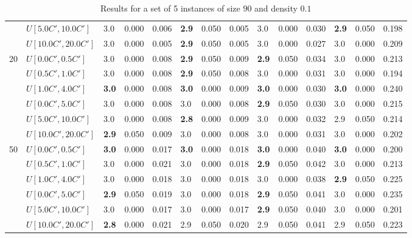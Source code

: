 \begin{table}[h]
{\begin{tabular}{|l|l||l|l|l||l|l|l||l|l|l||l|l|l|}
       & $U[5.0C',10.0C']$ & 3.0 & 0.000 & 0.006 & \textbf{2.9} & 0.050 & 0.005 & 3.0 & 0.000 & 0.030 & \textbf{2.9} & 0.050 & 0.198 \\
       & $U[10.0C',20.0C']$ & 3.0 & 0.000 & 0.005 & \textbf{2.9} & 0.050 & 0.005 & 3.0 & 0.000 & 0.027 & 3.0 & 0.000 & 0.209 \\
      \hline\hline
      \multirow{6}{*}{20} & $U[0.0C',0.5C']$ & 3.0 & 0.000 & 0.008 & \textbf{2.9} & 0.050 & 0.009 & \textbf{2.9} & 0.050 & 0.034 & 3.0 & 0.000 & 0.213 \\
       & $U[0.5C',1.0C']$ & 3.0 & 0.000 & 0.008 & \textbf{2.9} & 0.050 & 0.008 & 3.0 & 0.000 & 0.031 & 3.0 & 0.000 & 0.194 \\
       & $U[1.0C',4.0C']$ & \textbf{3.0} & 0.000 & 0.008 & \textbf{3.0} & 0.000 & 0.009 & \textbf{3.0} & 0.000 & 0.030 & \textbf{3.0} & 0.000 & 0.240 \\
       & $U[0.0C',5.0C']$ & 3.0 & 0.000 & 0.008 & 3.0 & 0.000 & 0.008 & \textbf{2.9} & 0.050 & 0.030 & 3.0 & 0.000 & 0.215 \\
       & $U[5.0C',10.0C']$ & 3.0 & 0.000 & 0.008 & \textbf{2.8} & 0.000 & 0.009 & 3.0 & 0.000 & 0.032 & 2.9 & 0.050 & 0.214 \\
       & $U[10.0C',20.0C']$ & \textbf{2.9} & 0.050 & 0.009 & 3.0 & 0.000 & 0.008 & 3.0 & 0.000 & 0.031 & 3.0 & 0.000 & 0.202 \\
      \hline\hline
      \multirow{6}{*}{50} & $U[0.0C',0.5C']$ & \textbf{3.0} & 0.000 & 0.017 & \textbf{3.0} & 0.000 & 0.018 & \textbf{3.0} & 0.000 & 0.040 & \textbf{3.0} & 0.000 & 0.200 \\
       & $U[0.5C',1.0C']$ & 3.0 & 0.000 & 0.021 & 3.0 & 0.000 & 0.018 & \textbf{2.9} & 0.050 & 0.042 & 3.0 & 0.000 & 0.213 \\
       & $U[1.0C',4.0C']$ & 3.0 & 0.000 & 0.018 & 3.0 & 0.000 & 0.018 & 3.0 & 0.000 & 0.038 & \textbf{2.9} & 0.050 & 0.225 \\
       & $U[0.0C',5.0C']$ & \textbf{2.9} & 0.050 & 0.019 & 3.0 & 0.000 & 0.018 & \textbf{2.9} & 0.050 & 0.041 & 3.0 & 0.000 & 0.235 \\
       & $U[5.0C',10.0C']$ & 3.0 & 0.000 & 0.017 & 3.0 & 0.000 & 0.017 & \textbf{2.9} & 0.050 & 0.040 & 3.0 & 0.000 & 0.201 \\
       & $U[10.0C',20.0C']$ & \textbf{2.8} & 0.000 & 0.021 & 2.9 & 0.050 & 0.020 & 2.9 & 0.050 & 0.041 & 2.9 & 0.050 & 0.223 \\
      \hline
      \end{tabular}
      }
      \caption{Results for a set of 5 instances of size $90$ and density $0.1$}
      \label{tab:pcpn90p1}
	  \end{table}
      
